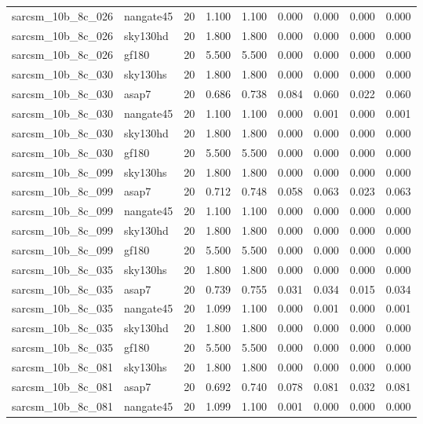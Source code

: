 \begin{tabular}{llrrrrrrr}
sarcsm\_10b\_8c\_026 & nangate45 & 20 & 1.100 & 1.100 & 0.000 & 0.000 & 0.000 & 0.000 \\
sarcsm\_10b\_8c\_026 & sky130hd & 20 & 1.800 & 1.800 & 0.000 & 0.000 & 0.000 & 0.000 \\
sarcsm\_10b\_8c\_026 & gf180 & 20 & 5.500 & 5.500 & 0.000 & 0.000 & 0.000 & 0.000 \\
sarcsm\_10b\_8c\_030 & sky130hs & 20 & 1.800 & 1.800 & 0.000 & 0.000 & 0.000 & 0.000 \\
sarcsm\_10b\_8c\_030 & asap7 & 20 & 0.686 & 0.738 & 0.084 & 0.060 & 0.022 & 0.060 \\
sarcsm\_10b\_8c\_030 & nangate45 & 20 & 1.100 & 1.100 & 0.000 & 0.001 & 0.000 & 0.001 \\
sarcsm\_10b\_8c\_030 & sky130hd & 20 & 1.800 & 1.800 & 0.000 & 0.000 & 0.000 & 0.000 \\
sarcsm\_10b\_8c\_030 & gf180 & 20 & 5.500 & 5.500 & 0.000 & 0.000 & 0.000 & 0.000 \\
sarcsm\_10b\_8c\_099 & sky130hs & 20 & 1.800 & 1.800 & 0.000 & 0.000 & 0.000 & 0.000 \\
sarcsm\_10b\_8c\_099 & asap7 & 20 & 0.712 & 0.748 & 0.058 & 0.063 & 0.023 & 0.063 \\
sarcsm\_10b\_8c\_099 & nangate45 & 20 & 1.100 & 1.100 & 0.000 & 0.000 & 0.000 & 0.000 \\
sarcsm\_10b\_8c\_099 & sky130hd & 20 & 1.800 & 1.800 & 0.000 & 0.000 & 0.000 & 0.000 \\
sarcsm\_10b\_8c\_099 & gf180 & 20 & 5.500 & 5.500 & 0.000 & 0.000 & 0.000 & 0.000 \\
sarcsm\_10b\_8c\_035 & sky130hs & 20 & 1.800 & 1.800 & 0.000 & 0.000 & 0.000 & 0.000 \\
sarcsm\_10b\_8c\_035 & asap7 & 20 & 0.739 & 0.755 & 0.031 & 0.034 & 0.015 & 0.034 \\
sarcsm\_10b\_8c\_035 & nangate45 & 20 & 1.099 & 1.100 & 0.000 & 0.001 & 0.000 & 0.001 \\
sarcsm\_10b\_8c\_035 & sky130hd & 20 & 1.800 & 1.800 & 0.000 & 0.000 & 0.000 & 0.000 \\
sarcsm\_10b\_8c\_035 & gf180 & 20 & 5.500 & 5.500 & 0.000 & 0.000 & 0.000 & 0.000 \\
sarcsm\_10b\_8c\_081 & sky130hs & 20 & 1.800 & 1.800 & 0.000 & 0.000 & 0.000 & 0.000 \\
sarcsm\_10b\_8c\_081 & asap7 & 20 & 0.692 & 0.740 & 0.078 & 0.081 & 0.032 & 0.081 \\
sarcsm\_10b\_8c\_081 & nangate45 & 20 & 1.099 & 1.100 & 0.001 & 0.000 & 0.000 & 0.000 \\

\end{tabular}

